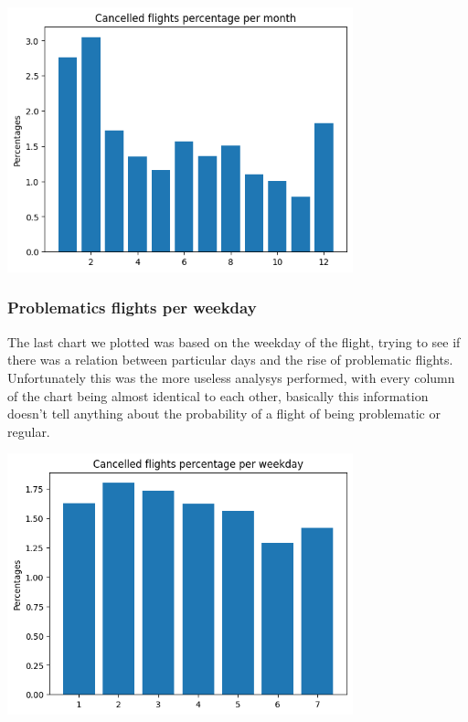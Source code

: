 \documentclass[
	letterpaper, %
	10pt, %
]{class}
\begin{document}
\begin{center}
    \includegraphics[width=10cm]{../images/cancelled_per_month.png}
\end{center}

\subsubsection{Problematics flights per weekday}

The last chart we plotted was based on the weekday of the flight, trying to see if there was a relation between particular days and the rise of problematic flights.\\

Unfortunately this was the more useless analysys performed, with every column of the chart being almost identical to each other, basically this information doesn't tell anything about the probability of a flight of being problematic or regular.

\begin{center}
    \includegraphics[width=10cm]{../images/cancelled_per_weekday.png}
\end{center}
\end{document}
